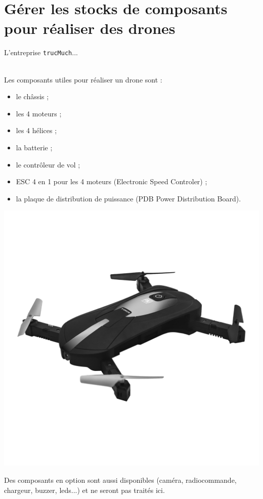 \documentclass[t,10pt]{article}
\begin{document}
\section{Gérer les stocks de composants pour réaliser des drones}
L'entreprise \texttt{trucMuch}...\\\

\begin{minipage}{.7\textwidth}%
Les composants utiles pour réaliser un drone sont :
\begin{itemize}
\item le châssis ;
\item les 4 moteurs ;
\item les 4 hélices ;
\item la batterie ;
\item le contrôleur de vol ;
\item ESC 4 en 1 pour les 4 moteurs (Electronic Speed Controler) ;
\item la plaque de distribution de puissance (PDB Power Distribution Board).
\end{itemize}
\end{minipage}%
\hfill
\begin{minipage}{.3\textwidth}%
\includegraphics[width=\textwidth]{drone.jpg}
\end{minipage}
Des composants en option sont aussi disponibles (caméra, radiocommande, chargeur, buzzer, leds...) et ne seront pas traités ici.\\
\end{document}
